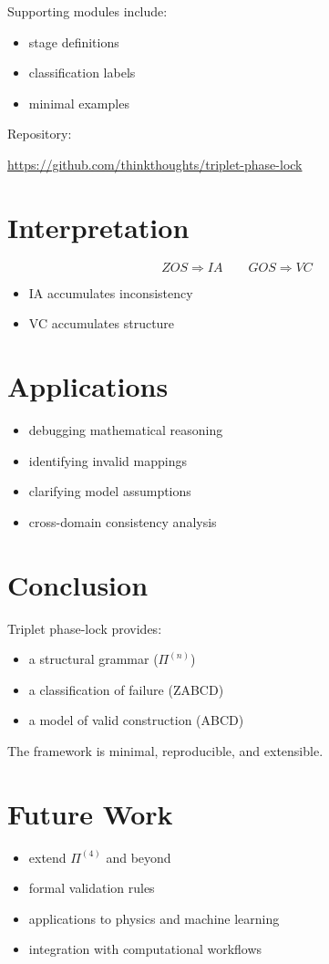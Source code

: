 \documentclass[11pt]{article}
\begin{document}
Supporting modules include:

\begin{itemize}
\item stage definitions
\item classification labels
\item minimal examples
\end{itemize}

Repository:

\begin{center}
\url{https://github.com/thinkthoughts/triplet-phase-lock}
\end{center}

\section{Interpretation}

\begin{equation}
ZOS \Rightarrow IA \qquad GOS \Rightarrow VC
\end{equation}

\begin{itemize}
\item IA accumulates inconsistency
\item VC accumulates structure
\end{itemize}

\section{Applications}

\begin{itemize}
\item debugging mathematical reasoning
\item identifying invalid mappings
\item clarifying model assumptions
\item cross-domain consistency analysis
\end{itemize}

\section{Conclusion}

Triplet phase-lock provides:

\begin{itemize}
\item a structural grammar ($\Pi^{(n)}$)
\item a classification of failure (ZABCD)
\item a model of valid construction (ABCD)
\end{itemize}

The framework is minimal, reproducible, and extensible.

\section{Future Work}

\begin{itemize}
\item extend $\Pi^{(4)}$ and beyond
\item formal validation rules
\item applications to physics and machine learning
\item integration with computational workflows
\end{itemize}
\end{document}
